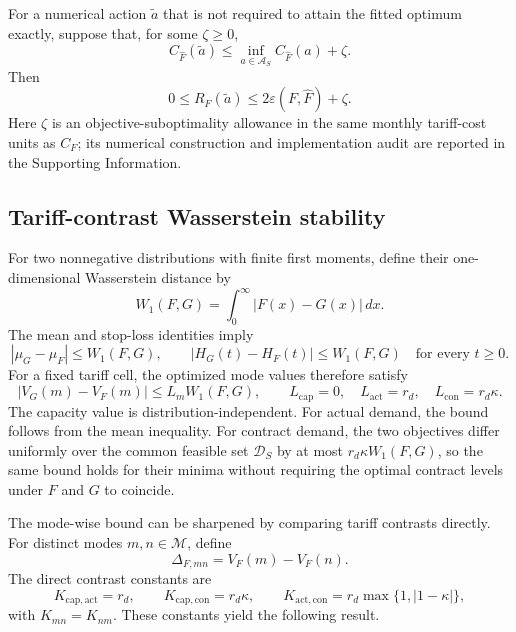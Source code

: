 \documentclass[Times1COL]{WileyNJDv5}
\begin{document}
For a numerical action $\widetilde a$ that is not required to attain
the fitted optimum exactly, suppose that, for some $\zeta\geq0$,
\[
C_{\widehat F}(\widetilde a)
\leq
\inf_{a\in\mathcal A_S}C_{\widehat F}(a)+\zeta.
\]
Then
\begin{equation}
\label{eq:solver-regret-bound}
0
\leq
R_F(\widetilde a)
\leq
2\varepsilon(F,\widehat F)+\zeta.
\end{equation}
Here $\zeta$ is an objective-suboptimality allowance in the same
monthly tariff-cost units as $C_F$; its numerical construction and
implementation audit are reported in the Supporting Information.

\subsection{Tariff-contrast Wasserstein stability}
\label{sec:contrast-wasserstein}

For two nonnegative distributions with finite first moments, define
their one-dimensional Wasserstein distance by
\begin{equation}
\label{eq:wasserstein-distance}
W_1(F,G)
=
\int_0^\infty |F(x)-G(x)|\,dx.
\end{equation}
The mean and stop-loss identities imply
\[
|\mu_G-\mu_F|\leq W_1(F,G),
\qquad
|H_G(t)-H_F(t)|\leq W_1(F,G)
\quad\text{for every }t\geq0.
\]
For a fixed tariff cell, the optimized mode values therefore satisfy
\begin{equation}
\label{eq:mode-specific-wasserstein}
|V_G(m)-V_F(m)|
\leq L_m W_1(F,G),
\qquad
L_{\mathrm{cap}}=0,\quad
L_{\mathrm{act}}=r_d,\quad
L_{\mathrm{con}}=r_d\kappa.
\end{equation}
The capacity value is distribution-independent. For actual demand,
the bound follows from the mean inequality. For contract demand, the
two objectives differ uniformly over the common feasible set
$\mathcal D_S$ by at most $r_d\kappa W_1(F,G)$, so the same bound
holds for their minima without requiring the optimal contract levels
under $F$ and $G$ to coincide.

The mode-wise bound can be sharpened by comparing tariff contrasts
directly. For distinct modes $m,n\in\mathcal M$, define
\[
\Delta_{F,mn}=V_F(m)-V_F(n).
\]
The direct contrast constants are
\begin{equation}
\label{eq:contrast-lipschitz-constants}
K_{\mathrm{cap},\mathrm{act}}=r_d,\qquad
K_{\mathrm{cap},\mathrm{con}}=r_d\kappa,\qquad
K_{\mathrm{act},\mathrm{con}}
=r_d\max\{1,|1-\kappa|\},
\end{equation}
with $K_{mn}=K_{nm}$. These constants yield the following result.
\end{document}
